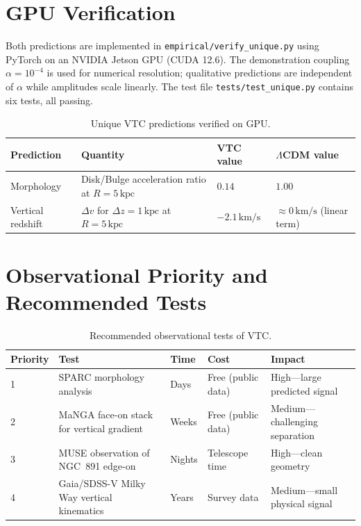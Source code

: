 \documentclass[11pt,a4paper]{article}
\theoremstyle{definition}
\begin{document}
\section{GPU Verification}

Both predictions are implemented in \texttt{empirical/verify\_unique.py} using PyTorch on an NVIDIA Jetson GPU (CUDA 12.6). The demonstration coupling $\alpha=10^{-4}$ is used for numerical resolution; qualitative predictions are independent of $\alpha$ while amplitudes scale linearly. The test file \texttt{tests/test\_unique.py} contains six tests, all passing.

\begin{table}[h]
\centering
\begin{tabular}{@{}llll@{}}
\toprule
\textbf{Prediction} & \textbf{Quantity} & \textbf{VTC value} & $\Lambda$CDM value \\
\midrule
Morphology & Disk/Bulge acceleration ratio at $R=5\,\mathrm{kpc}$ & $\mathbf{0.14}$ & $1.00$ \\
Vertical redshift & $\Delta v$ for $\Delta z=1\,\mathrm{kpc}$ at $R=5\,\mathrm{kpc}$ & $\mathbf{-2.1\,\mathrm{km/s}}$ & $\approx 0\,\mathrm{km/s}$ (linear term) \\
\bottomrule
\end{tabular}
\caption{Unique VTC predictions verified on GPU.}
\end{table}

\section{Observational Priority and Recommended Tests}

\begin{table}[h]
\centering
\begin{tabular}{@{}lllll@{}}
\toprule
\textbf{Priority} & \textbf{Test} & \textbf{Time} & \textbf{Cost} & \textbf{Impact} \\
\midrule
1 & SPARC morphology analysis & Days & Free (public data) & High---large predicted signal \\
2 & MaNGA face-on stack for vertical gradient & Weeks & Free (public data) & Medium---challenging separation \\
3 & MUSE observation of NGC~891 edge-on & Nights & Telescope time & High---clean geometry \\
4 & Gaia/SDSS-V Milky Way vertical kinematics & Years & Survey data & Medium---small physical signal \\
\bottomrule
\end{tabular}
\caption{Recommended observational tests of VTC.}
\end{table}
\end{document}
